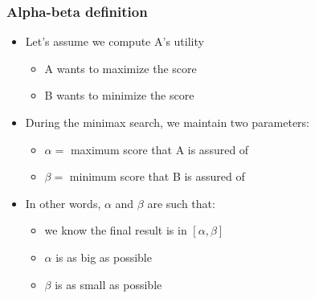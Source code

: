 \documentclass[12pt]{beamer}
\begin{document}
\begin{frame}
\frametitle{Alpha-beta definition}
\begin{itemize}
\item Let's assume we compute A's utility
    \begin{itemize}
    \item A wants to maximize the score
    \item B wants to minimize the score
    \end{itemize}
\item During the minimax search, we maintain two parameters:
    \begin{itemize}
    \item $\alpha =$ maximum score that A is assured of
    \item $\beta =$ minimum score that B is assured of
    \end{itemize}
\item In other words, $\alpha$ and $\beta$ are such that:
    \begin{itemize}
    \item we know the final result is in $[\alpha,\beta]$
    \item $\alpha$ is as big as possible
    \item $\beta$ is as small as possible
    \end{itemize}
\end{itemize}
\end{frame}
\end{document}
